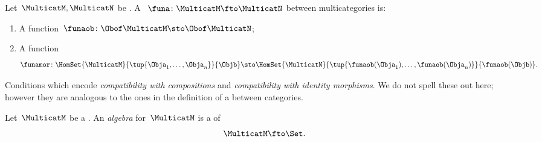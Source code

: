 { %
\begin{ctdefinition}
    \label{def:functors-multicats}
    Let~$\MulticatM,\MulticatN$ be .
    A ~$\funa\colon \MulticatM \fto \MulticatN$ between multicategories is:

    \constit
    \begin{enumerate}
        \item A function~$\funaob\colon \Obof\MulticatM\sto \Obof\MulticatN$;
        \item A function
              \begin{equation}
                  \funamor\colon \HomSet{\MulticatM}{\tup{\Obja_1,\ldots,\Obja_n}}{\Objb}\sto \HomSet{\MulticatN}{\tup{\funaob(\Obja_1),\ldots, \funaob(\Obja_n)}}{\funaob(\Objb)}.
              \end{equation}
    \end{enumerate}

    \condit

    Conditions which encode \emph{compatibility with compositions} and \emph{compatibility with identity morphisms}.
    We do not spell these out here; however they are analogous to the ones in the definition of a  between categories.
\end{ctdefinition}


\begin{ctdefinition}
    \label{def:algebra-of-multicat}
    Let~$\MulticatM$ be a .
    An \emph{algebra} for~$\MulticatM$ is a  of 
    $$\MulticatM \fto \Set.
    $$
\end{ctdefinition}


}
